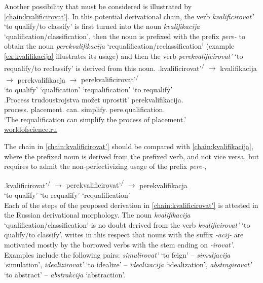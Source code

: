 Another possibility that must be considered is illustrated by \ref{chain:kvalificirovat'}. In this potential derivational chain, the verb \textit{kvalificirovat'} `to qualify/to classify' is first turned into the noun \textit{kvalifikacija} `qualification\slash classification', then the noun is prefixed with the prefix \textit{pere-} to obtain the noun \textit{perekvalifikacija}  `requalification/reclassification' (example \ref{ex:kvalifikacija} illustrates its usage) and then the verb \textit{perekvalificirovat'} `to requalify/to reclassify' is derived from this noun. 
\exg.\label{chain:kvalificirovat'}kvalificirovat'\textsuperscript{\PF\slash\IPF} {$\rightarrow$} kvalifikacija {$\rightarrow$} perekvalifikacja {$\rightarrow$} {perekvalificirovat'\textsuperscript{\PF\slash\IPF}}\\
{`to qualify'} {} {`qualfication'} {} {`requalification'} {} {`to requalify'}\\

\exg.\label{ex:kvalifikacija}Process trudoustrojstva mo\v{z}et uprostit' perekvalifikacija.\\
process. placement. can. simplify. pere.qualification.\\
\trans `The requalification can simplify the process of placement.'\\\hbox{}\hfill\hbox{\url{worldofscience.ru}}

The chain in \ref{chain:kvalificirovat'} should be compared with \ref{chain:kvalifikacija}, where the prefixed noun is derived from the prefixed verb, and not vice versa, but requires to admit the non-perfectivizing usage of the prefix \textit{pere-},

\exg.\label{chain:kvalifikacija}kvalificirovat'\textsuperscript{\PF\slash\IPF} {$\rightarrow$} {perekvalificirovat'\textsuperscript{\PF\slash\IPF}} {$\rightarrow$} perekvalifikacja\\
{`to qualify'} {} {`to requalify'} {} {`requalification'}\\

Each of the steps of the proposed derivation in \ref{chain:kvalificirovat'} is attested in the Russian derivational morphology. The noun \textit{kvalifikacija} `qualification\slash classification' is no doubt derived from the verb \textit{kvalificirovat'} `to qualify/to classify'. \citet{Shvedova:82} writes in this respect that nouns with the suffix \textit{-acij-} are motivated mostly by the borrowed verbs with the stem ending on \textit{-irovat'}. Examples \citep[taken from][159]{Shvedova:82} include the following pairs: \textit{simulirovat'} `to feign' -- \textit{simuljacija} `simulation', \textit{idealizirovat'} `to idealize'  -- \textit{idealizacija} `idealization', \textit{abstragirovat'} `to abstract' -- \textit{abstrakcija} `abstraction'.

